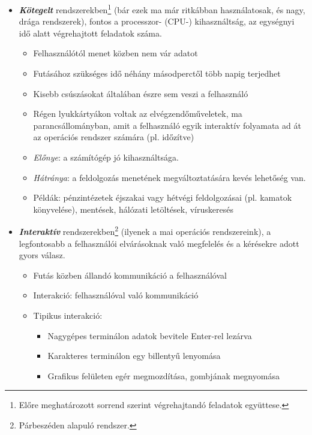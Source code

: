 \documentclass[tikz,12pt,margin=0px]{article}
\begin{document}
    \begin{itemize}[topsep=8pt,itemsep=4pt,partopsep=4pt, parsep=4pt]
        \item \emph{\textbf{Kötegelt}} rendszerekben\footnote{Előre meghatározott sorrend szerint végrehajtandó feladatok együttese.} (bár ezek ma már ritkábban használatosak, és nagy, drága rendszerek), fontos a processzor- (CPU-) kihasználtság, az egységnyi idő alatt végrehajtott feladatok száma.
        \begin{itemize}
            \item Felhasználótól menet közben nem vár adatot
            \item Futásához szükséges idő néhány másodperctől több napig terjedhet
            \item Kisebb csúszásokat általában észre sem veszi a felhasználó
            \item Régen lyukkártyákon voltak az elvégzendőműveletek, ma parancsállományban, amit a felhasználó egyik interaktív folyamata ad át az operációs rendszer számára (pl. időzítve)
            \item \emph{Előnye}: a számítógép jó kihasználtsága.
            \item \emph{Hátránya}: a feldolgozás menetének megváltoztatására kevés lehetőség van.
            \item Példák: pénzintézetek éjszakai vagy hétvégi feldolgozásai (pl. kamatok könyvelése), mentések, hálózati letöltések, víruskeresés\\
        \end{itemize}
        \item \emph{\textbf{Interaktív}} rendszerekben\footnote{Párbeszéden alapuló rendszer.} (ilyenek a mai operációs rendszereink), a legfontosabb a felhasználói elvárásoknak való megfelelés és a kérésekre adott gyors válasz.
            \begin{itemize}
                \item Futás közben állandó kommunikáció a felhasználóval
                \item Interakció: felhasználóval való kommunikáció
                \item Tipikus interakció:
                \begin{itemize}
                    \item Nagygépes terminálon adatok bevitele Enter‐rel lezárva
                    \item Karakteres terminálon egy billentyű lenyomása
                    \item Grafikus felületen egér megmozdítása, gombjának megnyomása

\end{itemize}
\end{itemize}
\end{itemize}
\end{document}
